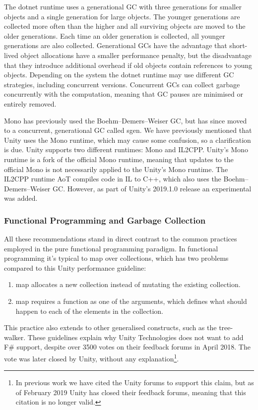 The dotnet runtime uses a generational \gls{GC} with three generations for smaller objects and a single generation for large objects\cite{dotnet:gc}. The younger generations are collected more often than the higher and all surviving objects are moved to the older generations. Each time an older generation is collected, all younger generations are also collected. Generational \glspl{GC} have the advantage that short-lived object allocations have a smaller performance penalty, but the disadvantage that they introduce additional overhead if old objects contain references to young objects\cite{sestoft2017programming}. Depending on the system the dotnet runtime may use different \gls{GC} strategies, including concurrent versions\cite{dotnet:gc}. Concurrent \glspl{GC} can collect garbage concurrently with the computation, meaning that \gls{GC} pauses are minimised or entirely removed\cite{dotnet:gc}.

Mono has previously used the Boehm–Demers–Weiser \gls{GC}, but has since moved to a concurrent, generational \gls{GC} called sgen\cite{mono:gc}. We have previously mentioned that Unity uses the Mono runtime, which may cause some confusion, so a clarification is due. Unity supports two different runtimes: Mono and IL2CPP. Unity's Mono runtime is a fork of the official Mono runtime\cite{unity:mono:github}, meaning that updates to the official Mono is not necessarily applied to the Unity's Mono runtime. The IL2CPP runtime \gls{AoT} compiles code in \gls{IL} to C++, which also uses the Boehm–Demers–Weiser \gls{GC}\cite{il2cpp:gc}. However, as part of Unity's 2019.1.0 release an experimental \textit{} was added\cite{unity:roadmap}.

\subsubsection{Functional Programming and Garbage Collection}
All these recommendations stand in direct contrast to the common practices employed in the pure functional programming paradigm. In functional programming it's typical to map over collections, which has two problems compared to this Unity performance guideline:
\begin{enumerate}
    \item map allocates a new collection instead of mutating the existing collection.
    \item map requires a function as one of the arguments, which defines what should happen to each of the elements in the collection.
\end{enumerate}
This practice also extends to other generalised constructs, such as the tree-walker\needcite. These guidelines explain why Unity Technologies does not want to add F\# support, despite over 3500 votes on their feedback forums in April 2018\cite{unity:fsharp}. The vote was later closed by Unity, without any explanation\footnote{In previous work we have cited the Unity forums to support this claim\cite{p92018gameplay}, but as of February 2019 Unity has closed their feedback forums, meaning that this citation is no longer valid.}.

